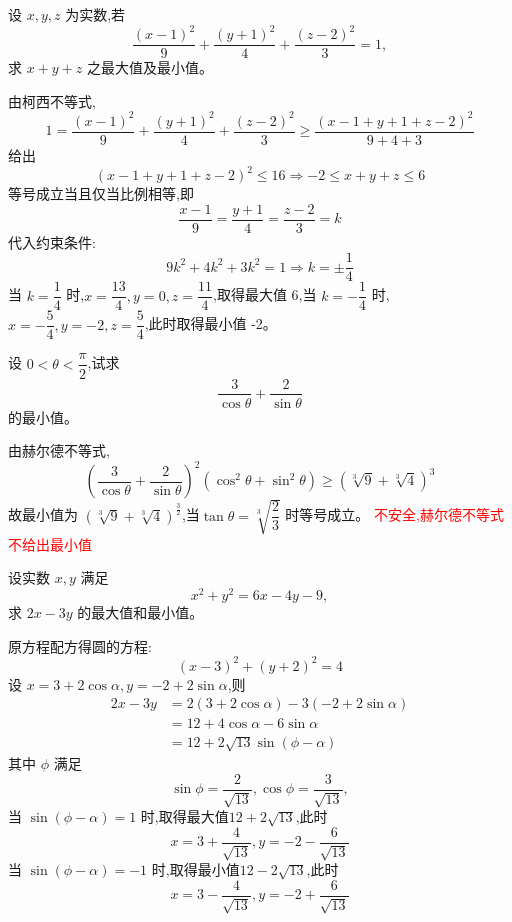 \begin{questions}
    \question 设 $x, y, z$ 为实数,若 
    \[
    \frac{(x-1)^2}{9} + \frac{(y+1)^2}{4} + \frac{(z-2)^2}{3} = 1,
    \]
    求 $x+y+z$ 之最大值及最小值。
    \begin{solution}
        由柯西不等式,
        \[
        1=\frac{(x-1)^2}{9} + \frac{(y+1)^2}{4} + \frac{(z-2)^2}{3} \ge \frac{(x-1+y+1+z-2)^2}{9+4+3}
        \]
        给出
        \[
        (x-1+y+1+z-2)^2 \le 16 \Rightarrow -2 \le x+y+z \le 6
        \]
        等号成立当且仅当比例相等,即
        \[
        \frac{x-1}{9} = \frac{y+1}{4} = \frac{z-2}{3} = k
        \]
        代入约束条件:
        \[
        9k^2 + 4k^2 + 3k^2 = 1 \Rightarrow k = \pm \frac{1}{4}
        \]
        当 $k = \dfrac{1}{4}$ 时,$x = \dfrac{13}{4}, y = 0, z = \dfrac{11}{4}$,取得最大值 6,当 $k = -\dfrac{1}{4}$ 时,$x = -\dfrac{5}{4}, y = -2, z = \dfrac{5}{4}$,此时取得最小值 -2。
    \end{solution}

\question 设 $0 < \theta < \dfrac{\pi}{2}$,试求 
\[
\frac{3}{\cos \theta} + \frac{2}{\sin \theta}
\]
的最小值。
\begin{solution}
    由赫尔德不等式,
    \[
    \left(\frac{3}{\cos \theta} + \frac{2}{\sin \theta}\right)^2(\cos^2 \theta+\sin^2 \theta) \ge (\sqrt[3]{9}+\sqrt[3]{4})^3
    \]
    故最小值为 $(\sqrt[3]{9}+\sqrt[3]{4})^\frac{3}{2}$,当$\tan \theta = \sqrt[3]{\dfrac{2}{3}}$ 时等号成立。
    \textcolor{red}{不安全,赫尔德不等式不给出最小值}
\end{solution}

    \question 设实数 $x, y$ 满足 
    \[
    x^2 + y^2 = 6x - 4y - 9,
    \]
    求 $2x - 3y$ 的最大值和最小值。
    \begin{solution}
        原方程配方得圆的方程:
        \[
        (x-3)^2 + (y+2)^2 = 4
        \]
        设 $x = 3 + 2\cos \alpha, y = -2 + 2\sin \alpha$,则
        \begin{align*}
        2x - 3y &= 2(3 + 2\cos \alpha) - 3(-2 + 2\sin \alpha) \\
        &= 12 + 4\cos \alpha - 6\sin \alpha \\
        &= 12 + 2\sqrt{13} \sin(\phi - \alpha)
        \end{align*}
        其中 $\phi$ 满足 
        \[
        \sin \phi = \frac{2}{\sqrt{13}}, \cos \phi = \frac{3}{\sqrt{13}},
        \]
        当 $\sin(\phi - \alpha) = 1$ 时,取得最大值$12 + 2\sqrt{13}$,此时
        \[
        x = 3 + \frac{4}{\sqrt{13}}, y = -2 - \frac{6}{\sqrt{13}}
        \]
        当 $\sin(\phi - \alpha) = -1$ 时,取得最小值$12 - 2\sqrt{13}$,此时
        \[
        x = 3 - \frac{4}{\sqrt{13}}, y = -2 + \frac{6}{\sqrt{13}}
        \]
    \end{solution}


\end{questions}
